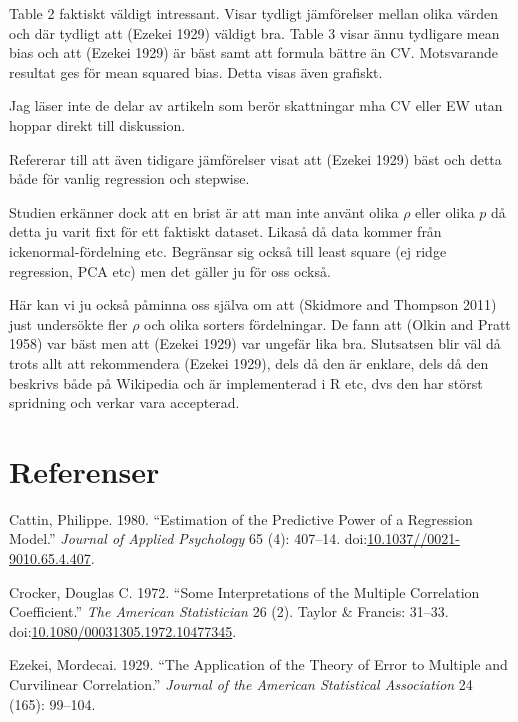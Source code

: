 \documentclass[]{article}
\begin{document}
Table 2 faktiskt väldigt intressant. Visar tydligt jämförelser mellan
olika värden och där tydligt att (Ezekei 1929) väldigt bra. Table 3
visar ännu tydligare mean bias och att (Ezekei 1929) är bäst samt att
formula bättre än CV. Motsvarande resultat ges för mean squared bias.
Detta visas även grafiskt.

Jag läser inte de delar av artikeln som berör skattningar mha CV eller
EW utan hoppar direkt till diskussion.

Refererar till att även tidigare jämförelser visat att (Ezekei 1929)
bäst och detta både för vanlig regression och stepwise.

Studien erkänner dock att en brist är att man inte använt olika \(\rho\)
eller olika \(p\) då detta ju varit fixt för ett faktiskt dataset.
Likaså då data kommer från ickenormal-fördelning etc. Begränsar sig
också till least square (ej ridge regression, PCA etc) men det gäller ju
för oss också.

Här kan vi ju också påminna oss själva om att (Skidmore and Thompson
2011) just undersökte fler \(\rho\) och olika sorters fördelningar. De
fann att (Olkin and Pratt 1958) var bäst men att (Ezekei 1929) var
ungefär lika bra. Slutsatsen blir väl då trots allt att rekommendera
(Ezekei 1929), dels då den är enklare, dels då den beskrivs både på
Wikipedia och är implementerad i R etc, dvs den har störst spridning och
verkar vara accepterad.

\section*{Referenser}\label{referenser}

\hypertarget{refs}{}
\hypertarget{ref-Cattin1980}{}
Cattin, Philippe. 1980. ``Estimation of the Predictive Power of a
Regression Model.'' \emph{Journal of Applied Psychology} 65 (4):
407--14.
doi:\href{https://doi.org/10.1037//0021-9010.65.4.407}{10.1037//0021-9010.65.4.407}.

\hypertarget{ref-Crocker1972}{}
Crocker, Douglas C. 1972. ``Some Interpretations of the Multiple
Correlation Coefficient.'' \emph{The American Statistician} 26 (2).
Taylor \& Francis: 31--33.
doi:\href{https://doi.org/10.1080/00031305.1972.10477345}{10.1080/00031305.1972.10477345}.

\hypertarget{ref-Ezekei1929}{}
Ezekei, Mordecai. 1929. ``The Application of the Theory of Error to
Multiple and Curvilinear Correlation.'' \emph{Journal of the American
Statistical Association} 24 (165): 99--104.
\end{document}
